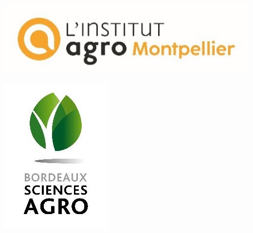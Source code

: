 \begin{titlepage}
    \begin{center}
        \begin{minipage}[t]{0.5\textwidth}
            \vspace{-0.5cm}
            \includegraphics[width=\textwidth]{ILLUSTRATIONS/iam_logo.jpg}
        \end{minipage}
        \hfill
        \begin{minipage}[t]{0.2\textwidth}
            \vspace{-0.5cm}
            \raggedleft
            \includegraphics[width=\textwidth]{ILLUSTRATIONS/bsa_logo_bis.jpg}
        \end{minipage}
        

\end{center}
\end{titlepage}
